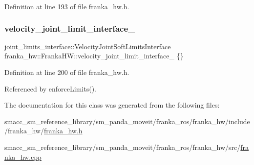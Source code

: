 Definition at line 193 of file franka\+\_\+hw.\+h.

\mbox{\label{classfranka__hw_1_1FrankaHW_a4e85e4440436f97a169553d281049e4e}} 
\subsubsection{\texorpdfstring{velocity\+\_\+joint\+\_\+limit\+\_\+interface\+\_\+}{velocity\_joint\_limit\_interface\_}}
{\footnotesize\ttfamily joint\+\_\+limits\+\_\+interface\+::\+Velocity\+Joint\+Soft\+Limits\+Interface franka\+\_\+hw\+::\+Franka\+H\+W\+::velocity\+\_\+joint\+\_\+limit\+\_\+interface\+\_\+ \{\}\hspace{0.3cm}{\ttfamily [private]}}



Definition at line 200 of file franka\+\_\+hw.\+h.



Referenced by enforce\+Limits().



The documentation for this class was generated from the following files\+:\begin{DoxyCompactItemize}
\item 
smacc\+\_\+sm\+\_\+reference\+\_\+library/sm\+\_\+panda\+\_\+moveit/franka\+\_\+ros/franka\+\_\+hw/include/franka\+\_\+hw/\hyperlink{franka__hw_8h}{franka\+\_\+hw.\+h}\item 
smacc\+\_\+sm\+\_\+reference\+\_\+library/sm\+\_\+panda\+\_\+moveit/franka\+\_\+ros/franka\+\_\+hw/src/\hyperlink{franka__hw_8cpp}{franka\+\_\+hw.\+cpp}\end{DoxyCompactItemize}
